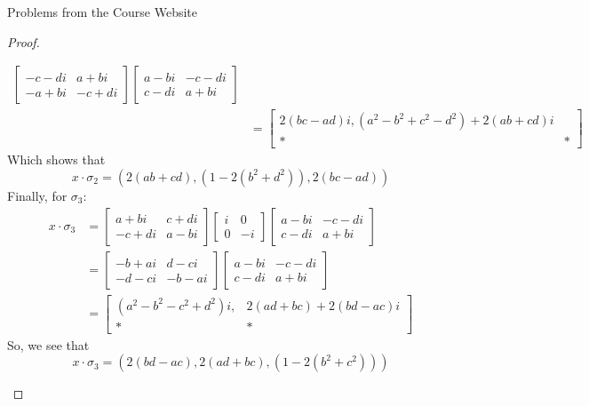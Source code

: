 \documentclass[12pt]{article}
\theoremstyle{definition}
\newenvironment{problem}[2][Problem]{\begin{trivlist}
\item[\hskip \labelsep {\bfseries #1}\hskip \labelsep {\bfseries #2.}]}{\end{trivlist}}
\begin{document}
\begin{section}{Problems from the Course Website}
\begin{problem}{3}
\begin{proof}
\begin{enumerate}[label=(\alph*)]
\begin{align*}
\begin{bmatrix}
				        -c - di & a + bi \\
				        -a + bi & -c + di
				        \end{bmatrix}\begin{bmatrix} a - bi & - c - di \\ c - di & a + bi \end{bmatrix}\\
				        &= \begin{bmatrix}
				        2(bc - ad)i, (a^2 - b^2  + c^2 - d^2) + 2(ab + cd)i\\
				        * & *
				        \end{bmatrix}
				        \end{align*}
				        Which shows that
				        \[
                            x \cdot \sigma_2 = (2(ab + cd), (1 - 2 (b^2 + d^2)), 2(bc - ad))				        
				        \]
				        Finally, for $\sigma_3$:
				        \begin{align*}
				            x \cdot \sigma_3 &= \begin{bmatrix} a + bi & c + di \\ -c + di & a - bi \end{bmatrix} \begin{bmatrix} i & 0 \\ 0 & -i \end{bmatrix} \begin{bmatrix} a - bi & - c - di \\ c - di & a + bi \end{bmatrix}\\
				            &= \begin{bmatrix}
				            -b + ai & d - ci \\
				            -d - ci & -b - ai
				            \end{bmatrix}\begin{bmatrix} a - bi & - c - di \\ c - di & a + bi \end{bmatrix}\\
				            &= \begin{bmatrix}
				            (a^2 - b^2 -c^2 + d^2)i, & 2(ad + bc) + 2(bd - ac)i\\
				            * & * 
				            \end{bmatrix}
				            \end{align*}			
				            So, we see that
				            \[
                                x \cdot \sigma_3 = (2(bd - ac), 2(ad + bc), (1 - 2(b^2 + c^2)))				            
\]
\end{enumerate}
\end{proof}
\end{problem}
\end{section}
\end{document}
